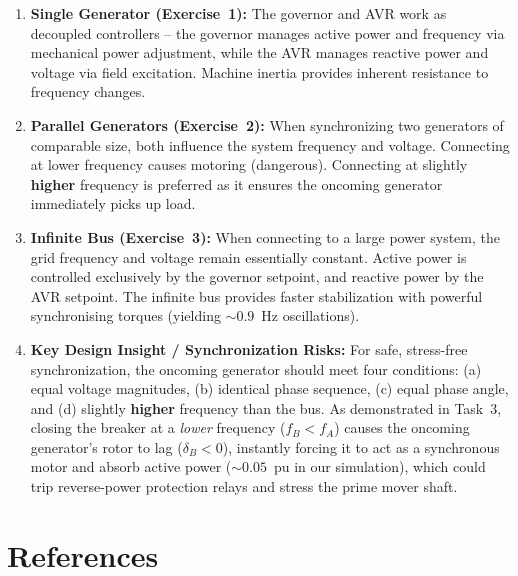 \documentclass[12pt, a4paper]{article}
\begin{document}
\begin{enumerate}
    \item \textbf{Single Generator (Exercise~1):} The governor and AVR work as decoupled controllers -- the governor manages active power and frequency via mechanical power adjustment, while the AVR manages reactive power and voltage via field excitation. Machine inertia provides inherent resistance to frequency changes.
    
    \item \textbf{Parallel Generators (Exercise~2):} When synchronizing two generators of comparable size, both influence the system frequency and voltage. Connecting at lower frequency causes motoring (dangerous). Connecting at slightly \textbf{higher} frequency is preferred as it ensures the oncoming generator immediately picks up load.
    
    \item \textbf{Infinite Bus (Exercise~3):} When connecting to a large power system, the grid frequency and voltage remain essentially constant. Active power is controlled exclusively by the governor setpoint, and reactive power by the AVR setpoint. The infinite bus provides faster stabilization with powerful synchronising torques (yielding $\sim 0.9$~Hz oscillations).
    
    \item \textbf{Key Design Insight / Synchronization Risks:} For safe, stress-free synchronization, the oncoming generator should meet four conditions: (a) equal voltage magnitudes, (b) identical phase sequence, (c) equal phase angle, and (d) slightly \textbf{higher} frequency than the bus. As demonstrated in Task~3, closing the breaker at a \textit{lower} frequency ($f_B < f_A$) causes the oncoming generator's rotor to lag ($\delta_B < 0$), instantly forcing it to act as a synchronous motor and absorb active power ($\sim 0.05$~pu in our simulation), which could trip reverse-power protection relays and stress the prime mover shaft.
\end{enumerate}

\newpage

\section{References}
\end{document}
